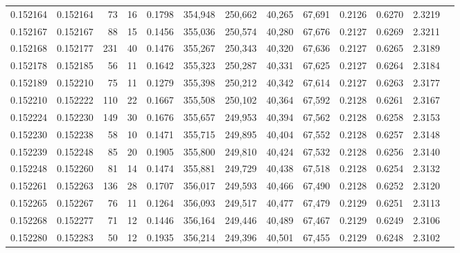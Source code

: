 \begin{tabular}{rrrrrrrrrrrrr}
0.152164 & 0.152164 &    73 &  16 &                                     0.1798 & 354,948 & 250,662 &  40,265 &  67,691 & 0.2126 & 0.6270 & 2.3219 \\
0.152167 & 0.152167 &    88 &  15 &                                     0.1456 & 355,036 & 250,574 &  40,280 &  67,676 & 0.2127 & 0.6269 & 2.3211 \\
0.152168 & 0.152177 &   231 &  40 &                                     0.1476 & 355,267 & 250,343 &  40,320 &  67,636 & 0.2127 & 0.6265 & 2.3189 \\
0.152178 & 0.152185 &    56 &  11 &                                     0.1642 & 355,323 & 250,287 &  40,331 &  67,625 & 0.2127 & 0.6264 & 2.3184 \\
0.152189 & 0.152210 &    75 &  11 &                                     0.1279 & 355,398 & 250,212 &  40,342 &  67,614 & 0.2127 & 0.6263 & 2.3177 \\
0.152210 & 0.152222 &   110 &  22 &                                     0.1667 & 355,508 & 250,102 &  40,364 &  67,592 & 0.2128 & 0.6261 & 2.3167 \\
0.152224 & 0.152230 &   149 &  30 &                                     0.1676 & 355,657 & 249,953 &  40,394 &  67,562 & 0.2128 & 0.6258 & 2.3153 \\
0.152230 & 0.152238 &    58 &  10 &                                     0.1471 & 355,715 & 249,895 &  40,404 &  67,552 & 0.2128 & 0.6257 & 2.3148 \\
0.152239 & 0.152248 &    85 &  20 &                                     0.1905 & 355,800 & 249,810 &  40,424 &  67,532 & 0.2128 & 0.6256 & 2.3140 \\
0.152248 & 0.152260 &    81 &  14 &                                     0.1474 & 355,881 & 249,729 &  40,438 &  67,518 & 0.2128 & 0.6254 & 2.3132 \\
0.152261 & 0.152263 &   136 &  28 &                                     0.1707 & 356,017 & 249,593 &  40,466 &  67,490 & 0.2128 & 0.6252 & 2.3120 \\
0.152265 & 0.152267 &    76 &  11 &                                     0.1264 & 356,093 & 249,517 &  40,477 &  67,479 & 0.2129 & 0.6251 & 2.3113 \\
0.152268 & 0.152277 &    71 &  12 &                                     0.1446 & 356,164 & 249,446 &  40,489 &  67,467 & 0.2129 & 0.6249 & 2.3106 \\
0.152280 & 0.152283 &    50 &  12 &                                     0.1935 & 356,214 & 249,396 &  40,501 &  67,455 & 0.2129 & 0.6248 & 2.3102 \\

\end{tabular}
